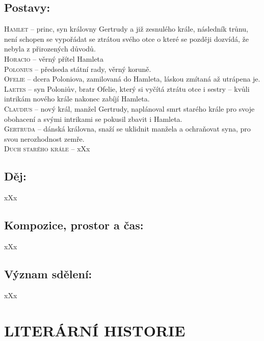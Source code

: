\documentclass[A4paper]{extarticle} %
\begin{document}
\subsection*{Postavy:}
\noindent 
\textsc{Hamlet --} princ, syn královny Gertrudy a již zesnulého krále, následník trůnu, není schopen se vypořádat se ztrátou svého otce o které se později dozvídá, že nebyla z přirozených důvodů. \\
\textsc{Horacio --} věrný přítel Hamleta \\
\textsc{Polonius --} předseda státní rady, věrný koruně. \\
\textsc{Ofelie --} dcera Poloniova, zamilovaná do Hamleta, láskou zmítaná až utrápena je. \\
\textsc{Laetes --} syn Poloniův, bratr Ofelie, který si vyčítá ztrátu otce i sestry -- kvůli intrikám nového krále nakonec zabíjí Hamleta. \\
\textsc{Claudius --} nový král, manžel Gertrudy, naplánoval smrt starého krále pro svoje obohacení a svými intrikami se pokusil zbavit i Hamleta. \\
\textsc{Gertruda --} dánská královna, snaží se uklidnit manžela a ochraňovat syna, pro svou nerozhodnost zemře. \\
\textsc{Duch starého krále --} xXx

\subsection*{Děj:}
\noindent 
xXx

\subsection*{Kompozice, prostor a čas:}
\noindent 
xXx

\subsection*{Význam sdělení:}
\noindent 
xXx

\section*{LITERÁRNÍ HISTORIE}


\end{document}
